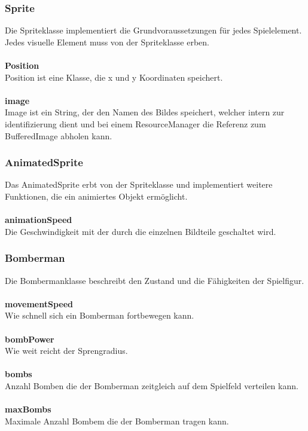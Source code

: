\documentclass[11pt]{scrartcl}
\begin{document}
\newpage

\subsubsection{Sprite}
\label{sec:Sprite}
Die Spriteklasse implementiert die Grundvoraussetzungen für jedes Spielelement. Jedes visuelle Element muss von der Spriteklasse erben.
\\\\
\textbf{Position}\\
Position ist eine Klasse, die x und y Koordinaten speichert.
\\\\
\textbf{image}\\
Image ist ein String, der den Namen des Bildes speichert, welcher intern zur identifizierung dient und bei einem ResourceManager die Referenz zum BufferedImage abholen kann.

\subsubsection{AnimatedSprite}
\label{sec:AnimatedSprite}
Das AnimatedSprite erbt von der Spriteklasse und implementiert weitere Funktionen, die ein animiertes Objekt ermöglicht.
\\\\
\textbf{animationSpeed}\\
Die Geschwindigkeit mit der durch die einzelnen Bildteile geschaltet wird.

\subsubsection{Bomberman}
\label{sec:Bomberman}
Die Bombermanklasse beschreibt den Zustand und die Fähigkeiten der Spielfigur.
\\\\
\textbf{movementSpeed }\\
Wie schnell sich ein Bomberman fortbewegen kann.
\\\\
\textbf{bombPower}\\
Wie weit reicht der Sprengradius.
\\\\
\textbf{bombs}\\ 
Anzahl Bomben die der Bomberman zeitgleich auf dem Spielfeld verteilen kann.
\\\\
\textbf{maxBombs}\\
Maximale Anzahl Bombem die der Bomberman tragen kann.
\end{document}
